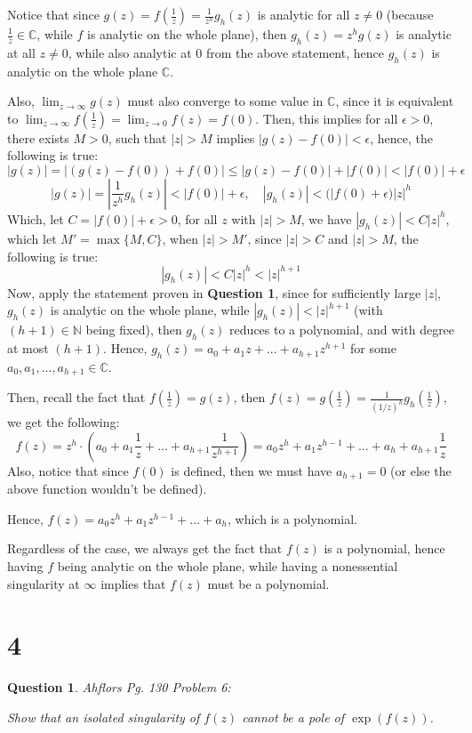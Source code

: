 \documentclass{article}
\newtheorem{question}{Question}
\begin{document}
Notice that since $g(z)=f(\frac{1}{z})=\frac{1}{z^h}g_h(z)$ is analytic for all $z\neq 0$ (because $\frac{1}{z}\in\mathbb{C}$, while $f$ is analytic on the whole plane),
then $g_h(z) = z^hg(z)$ is analytic at all $z\neq 0$, while also analytic at $0$ from the above statement, hence $g_h(z)$ is analytic on the whole plane $\mathbb{C}$.

Also, $\lim_{z\rightarrow\infty}g(z)$ must also converge to some value in $\mathbb{C}$, since it is equivalent to $\lim_{z\rightarrow\infty}f(\frac{1}{z})=\lim_{z\rightarrow 0}f(z)=f(0)$.
Then, this implies for all $\epsilon>0$, there exists $M>0$, such that $|z|>M$ implies $|g(z)-f(0)| < \epsilon$,
hence, the following is true:
$$|g(z)| = |(g(z)-f(0))+f(0)| \leq |g(z)-f(0)|+|f(0)| < |f(0)|+\epsilon$$
$$|g(z)|=\left|\frac{1}{z^h}g_h(z)\right| < |f(0)|+\epsilon,\quad |g_h(z)| < (|f(0)+\epsilon)|z|^h$$
Which, let $C=|f(0)|+\epsilon>0$, for all $z$ with $|z|>M$, we have $|g_h(z)| < C|z|^h$, which let $M'=\max\{M, C\}$, when $|z|>M'$,
since $|z|>C$ and $|z|>M$, the following is true:
$$|g_h(z)|<C|z|^h < |z|^{h+1}$$
Now, apply the statement proven in \textbf{Question 1}, since for sufficiently large $|z|$, $g_h(z)$ is analytic on the whole plane, while $|g_h(z)|< |z|^{h+1}$ (with $(h+1)\in\mathbb{N}$ being fixed),
then $g_h(z)$ reduces to a polynomial, and with degree at most $(h+1)$. Hence, $g_h(z)=a_0+a_1z+...+a_{h+1}z^{h+1}$ for some $a_0,a_1,...,a_{h+1}\in\mathbb{C}$.

Then, recall the fact that $f(\frac{1}{z})=g(z)$, then $f(z)=g(\frac{1}{z})=\frac{1}{(1/z)^h}g_h(\frac{1}{z})$, we get the following:
$$f(z)=z^h\cdot \left(a_0+a_1\frac{1}{z}+...+a_{h+1}\frac{1}{z^{h+1}}\right) = a_0z^h + a_1z^{h-1}+...+a_h+a_{h+1}\frac{1}{z}$$
Also, notice that since $f(0)$ is defined, then we must have $a_{h+1}=0$ (or else the above function wouldn't be defined).

Hence, $f(z)=a_0z^h + a_1z^{h-1}+...+a_h$, which is a polynomial.

\hfill

\hfill

Regardless of the case, we always get the fact that $f(z)$ is a polynomial, hence having $f$ being analytic on the whole plane,
while having a nonessential singularity at $\infty$ implies that $f(z)$ must be a polynomial.


\break

\section*{4}
\begin{myBox}[]{}
    \begin{question}
        Ahflors Pg. 130 Problem 6:

        Show that an isolated singularity of $f(z)$ cannot be a pole of $\exp(f(z))$.
    \end{question}
\end{myBox}
\end{document}
